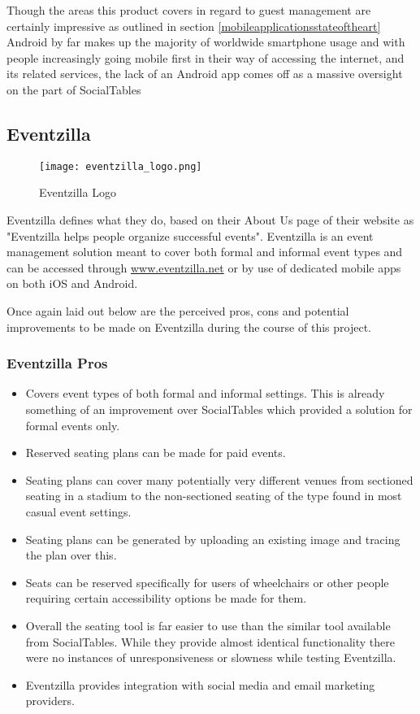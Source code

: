 Though the areas this product covers in regard to guest management are certainly impressive as outlined in section \ref{mobileapplicationsstateoftheart} Android by far makes up the majority of worldwide smartphone usage and with people increasingly going mobile first in their way of accessing the internet, and its related services, the lack of an Android app comes off as a massive oversight on the part of SocialTables

\subsection{Eventzilla}
\label{eventzillasection}

\begin{figure}[ht]
  \centering
      \texttt{[image: eventzilla\_logo.png]}
  \caption[Eventzilla Logo]{Eventzilla Logo\cite{eventzillalogosource}}
  \label{fig:eventzillalogo}
\end{figure}

Eventzilla defines what they do, based on their About Us page of their website as "Eventzilla helps people organize successful events"\cite{eventzillaaboutus}. Eventzilla is an event management solution meant to cover both formal and informal event types and can be accessed through \url{www.eventzilla.net} or by use of dedicated mobile apps on both iOS\cite{eventzillaiosapp} and Android\cite{eventzillaandroidapp}.

Once again laid out below are the perceived pros, cons and potential improvements to be made on Eventzilla during the course of this project.

\subsubsection{Eventzilla Pros}

\begin{itemize}
    \item Covers event types of both formal and informal settings. This is already something of an improvement over SocialTables which provided a solution for formal events only.
    \item Reserved seating plans can be made for paid events.
    \item Seating plans can cover many potentially very different venues from sectioned seating in a stadium to the non-sectioned seating of the type found in most casual event settings.
    \item Seating plans can be generated by uploading an existing image and tracing the plan over this.
    \item Seats can be reserved specifically for users of wheelchairs or other people requiring certain accessibility options be made for them.
    \item Overall the seating tool is far easier to use than the similar tool available from SocialTables. While they provide almost identical functionality there were no instances of unresponsiveness or slowness while testing Eventzilla.
    \item Eventzilla provides integration with social media and email marketing providers.
\end{itemize}

